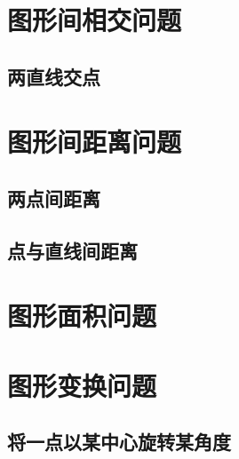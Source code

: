 
\section{图形间相交问题}

\subsection{两直线交点}




\section{图形间距离问题}

\subsection{两点间距离}



\subsection{点与直线间距离}




\section{图形面积问题}


\section{图形变换问题}

\subsection{将一点以某中心旋转某角度}




